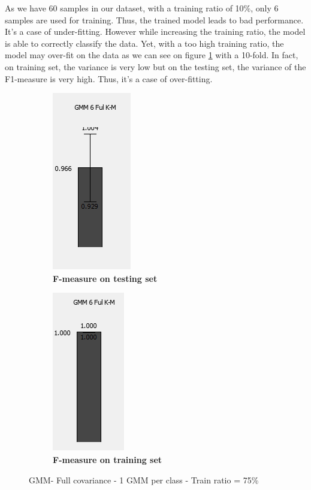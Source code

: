 As we have 60 samples in our dataset, with a training ratio of 10\%, only 6 samples are used for training. Thus, the trained model leads to bad performance. It's a case of under-fitting. However while increasing the training ratio, the model is able to correctly classify the data. Yet, with a too high training ratio, the model may over-fit on the data as we can see on figure \ref{fig:train_ratio_overfit} with a 10-fold. In fact, on training set, the variance is very low but on the testing set, the variance of the F1-measure is very high. Thus, it's a case of over-fitting. 

\begin{figure} [ht]
\centering
	\begin{subfigure}[h]{0.49\textwidth}
    \centering
	\includegraphics[height=0.14\textheight]{./classification/f_measure_testing_75pourcent.png}
	\caption{\bf F-measure on testing set}
	\end{subfigure}
    \begin{subfigure}[h]{0.49\textwidth}
    \centering
    \includegraphics[height=0.14\textheight]{./classification/f_measure_training_75pourcent.png}
	\caption{\bf F-measure on training set}
    \end{subfigure}

\caption{GMM- Full covariance - 1 GMM per class - Train ratio = 75\%}
\label{fig:train_ratio_overfit}
\end{figure}

